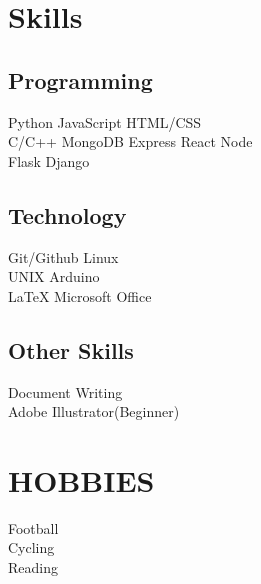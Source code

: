 \documentclass[]{resume}
\begin{document}
\begin{minipage}[t]{0.33\textwidth}

\bigskip

\section{Skills}
\subsection{Programming}
Python \textbullet{} JavaScript \textbullet{} HTML/CSS \\
 C/C++ \textbullet{} MongoDB \textbullet{} Express \textbullet{} React \textbullet{} Node  \\
Flask \textbullet{} Django \\
\sectionsep

\medskip

\subsection{Technology}
Git/Github \textbullet{} Linux \\
UNIX \textbullet{} Arduino \\
\LaTeX \textbullet{} Microsoft Office\\
\sectionsep

\subsection{Other Skills}
Document Writing \\
Adobe Illustrator(Beginner)

\bigskip
\bigskip


\section{HOBBIES}
Football\\
Cycling\\
Reading\\

\sectionsep
\bigskip
\bigskip



\end{minipage}
\end{document}
